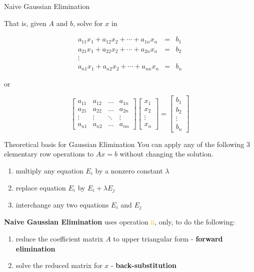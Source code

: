 \documentclass[12pt]{beamer}
\begin{document}
\begin{frame}{Naive Gaussian Elimination}

That is, given $A$ and $b$, solve for $x$ in

\begin{eqnarray*}
a_{11}x_1 +a_{12}x_2+ \dotsb +a_{1n}x_n &=&b_1 \\
a_{21}x_1 +a_{22}x_2+ \dotsb +a_{2n}x_n &=&b_2 \\
\vdots \\
a_{n1}x_1 +a_{n2}x_2+ \dotsb +a_{nn}x_n &=&b_n
\end{eqnarray*}

\noindent
or

\[
\begin{bmatrix}
    a_{11}       & a_{12} & \dots & a_{1n} \\
    a_{21}       & a_{22} & \dots & a_{2n} \\
    \vdots & \vdots & \ddots & \vdots \\
    a_{n1}       & a_{n2} & \dots & a_{nn}
\end{bmatrix}
\begin{bmatrix}
    x_{1} \\
    x_{2}  \\
    \vdots \\
    x_{n} 
\end{bmatrix}
=
\begin{bmatrix}
    b_{1} \\
    b_{2}  \\
    \vdots \\
    b_{n} 
\end{bmatrix}
\]

\end{frame}

\begin{frame}{Theoretical basis for Gaussian Elimination}
You can apply any of the following 3 elementary row operations to $Ax=b$ without
changing the solution.

\begin{enumerate}[i]
  \item multiply any equation $E_i$ by a nonzero constant $\lambda$
  \item replace equation $E_i$ by $E_i + \lambda E_j$
  \item interchange any two equations $E_i$ and $E_j$
\end{enumerate}

{\bf Naive Gaussian Elimination} uses operation \textcolor{orange}{ii}, only, to do the following:
\begin{enumerate}
  \item reduce the coefficient matrix $A$ to upper triangular form - {\bf forward elimination}
  \item solve the reduced matrix for $x$ - {\bf back-substitution}
\end{enumerate}

\end{frame}
\end{document}

